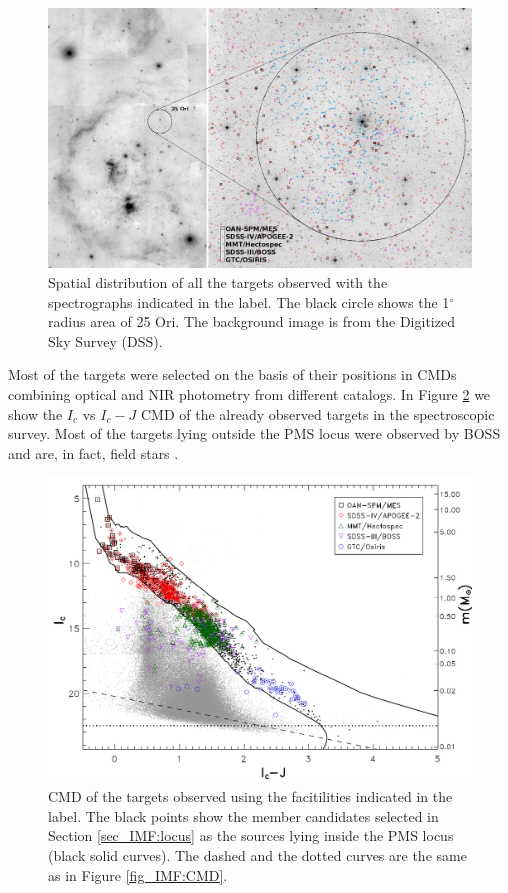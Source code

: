 \documentclass[12pt]{article}
\begin{document}
\begin{figure}[ht!]
	\includegraphics[width=1.0\textwidth]{sky_all_spectra.png}
	\caption[Spatial distribution of all the targets in our spectroscopic survey.]{Spatial distribution of all the targets observed with the spectrographs indicated in the label. The black circle shows the 1$^\circ$ radius area of 25 Ori. The background image is from the Digitized Sky Survey (DSS).}
	\label{fig:sky_all}
\end{figure}

Most of the targets were selected on the basis of their positions in CMDs combining optical and NIR photometry from different catalogs. In Figure \ref{fig:CMD_all} we show the $I_c$ vs $I_c-J$ CMD of the already observed targets in the spectroscopic survey. Most of the targets lying outside the PMS locus were observed by BOSS \citep{Alam2015} and are, in fact, field stars \citep{Suarez2017}.

\begin{figure}%
	\includegraphics[width=1.0\textwidth]{CMD_targets.pdf}
	\caption[CMD of the targets with spectra.]{CMD of the targets observed using the facitilities indicated in the label. The black points show the member candidates selected in Section \ref{sec_IMF:locus} as the sources lying inside the PMS locus (black solid curves). The dashed and the dotted curves are the same as in Figure \ref{fig_IMF:CMD}.}
	\label{fig:CMD_all}
\end{figure}
\end{document}
